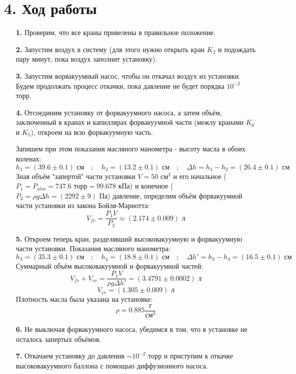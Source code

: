 \documentclass[a4paper]{article}
\begin{document}
\section*{4. Ход работы}
\begin{itemize}
\item[\textbf{1. }] Проверим, что все краны привелены в правильное положение.
\item[\textbf{2. }] Запустим воздух в систему (для этого нужно открыть кран $K_2$ и подождать пару минут, пока воздух заполнит установку).
\item[\textbf{3. }] Запустим ворвакуумный насос, чтобы он откачал воздух из установки. Будем продолжать процесс откачки, пока давление не будет порядка $10^{-2}$ торр.
\item[\textbf{4. }] Отсоединим установку от форвакуумного насоса, а затем объём, заключенный в кранах и капиллярах форвакуумной части (межлу кранами $K_6 $ и $K_5$), откроем на всю форвакуумную часть. 

\noindent
Запишем при этом показания масляного манометра - высоту масла в обоих коленах:
\[h_1 = (39.6 \pm 0.1) \text{ см} \quad ; \quad h_2 = (13.2 \pm 0.1) \text{ см} \quad ; \quad \Delta h = h_1 - h_2 = (26.4 \pm 0.1) \text{ см}\]
Зная объём "запертой" части установки $V = 50 \text{ см}^3$ и его начальное ($P_1 = P_{atm} = 747.6 \text{ торр} = 99.678 \text{ кПа}$) и конечное ($P_2 = \rho g \Delta h = (2292 \pm 9) \text{ Па}$) давление, определим объём форвакуумной части установки из закона Бойля-Мариотта:
\[V_{fv} = \frac{P_1 V}{P_2} \approx (2.174 \pm 0.009) \text{ л} \]
\item[\textbf{5.}] Откроем теперь кран, разделявший высоковакуумную и форвакуумную части установки. Показания масляного манометра:
\[h_3 = (35.3 \pm 0.1) \text{ см} \quad ; \quad h_4 = (18.8 \pm 0.1) \text{ см} \quad ; \quad \Delta h' = h_3 - h_4 = (16.5 \pm 0.1) \text{ см}  \]
Суммарный объём высоковакуумной и форвакуумной частей:
\[V_{fv} + V_{vv} = \frac{P_1 V}{\rho g \Delta h'} = (3.4791 \pm 0.0002) \text{ л} \]
\[V_{vv} = (1.305 \pm 0.009) \text{ л} \]
Плотность масла была указана на установке:
\[\rho = 0.885 \frac{\text{г}}{\text{см}^3} \]
\item[\textbf{6. }] Не выключая форвакуумного насоса, убедимся в том, что в установке не осталось запертых объёмов.
\item[\textbf{7. }] Откачаем установку до давления $\sim 10^{-2}$ торр и приступим к откачке высоковакуумного баллона с помощью диффузионного насоса. 


\end{itemize}
\end{document}
